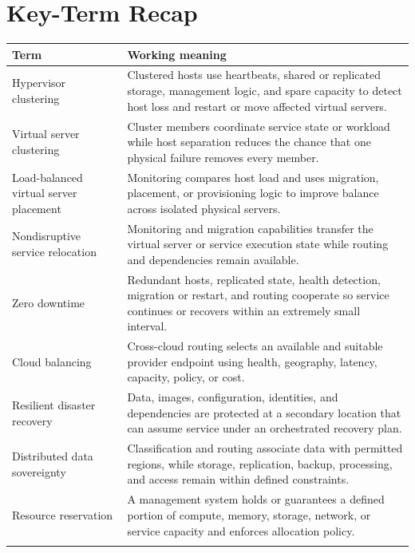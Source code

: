 \documentclass[11pt]{article}
\begin{document}
\section{Key-Term Recap}
\begin{longtable}{@{}>{\RaggedRight\arraybackslash}p{}>{\RaggedRight\arraybackslash}p{}@{}}
\toprule\rowcolor{Navy}\color{white}\textbf{Term} & \color{white}\textbf{Working meaning}\\\midrule\endhead
Hypervisor clustering & Clustered hosts use heartbeats, shared or replicated storage, management logic, and spare capacity to detect host loss and restart or move affected virtual servers. \\\addlinespace[2pt]
Virtual server clustering & Cluster members coordinate service state or workload while host separation reduces the chance that one physical failure removes every member. \\\addlinespace[2pt]
Load-balanced virtual server placement & Monitoring compares host load and uses migration, placement, or provisioning logic to improve balance across isolated physical servers. \\\addlinespace[2pt]
Nondisruptive service relocation & Monitoring and migration capabilities transfer the virtual server or service execution state while routing and dependencies remain available. \\\addlinespace[2pt]
Zero downtime & Redundant hosts, replicated state, health detection, migration or restart, and routing cooperate so service continues or recovers within an extremely small interval. \\\addlinespace[2pt]
Cloud balancing & Cross-cloud routing selects an available and suitable provider endpoint using health, geography, latency, capacity, policy, or cost. \\\addlinespace[2pt]
Resilient disaster recovery & Data, images, configuration, identities, and dependencies are protected at a secondary location that can assume service under an orchestrated recovery plan. \\\addlinespace[2pt]
Distributed data sovereignty & Classification and routing associate data with permitted regions, while storage, replication, backup, processing, and access remain within defined constraints. \\\addlinespace[2pt]
Resource reservation & A management system holds or guarantees a defined portion of compute, memory, storage, network, or service capacity and enforces allocation policy. \\\addlinespace[2pt]

\end{longtable}
\end{document}
